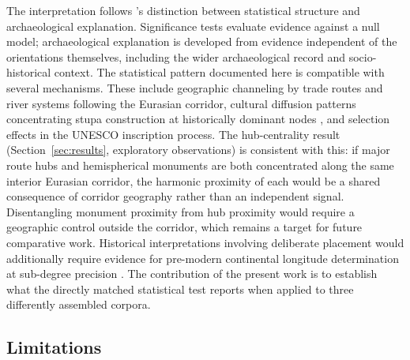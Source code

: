 \documentclass[12pt,a4paper]{article}
\begin{document}
The interpretation follows \citet{silva2020statistical}'s distinction
between statistical structure and archaeological explanation.
Significance tests evaluate evidence against a null model;
archaeological explanation is developed from evidence independent of
the orientations themselves, including the wider archaeological record
and socio-historical context. The statistical pattern documented here
is compatible with several mechanisms. These include geographic
channeling by trade routes and river systems following the Eurasian
corridor, cultural diffusion patterns concentrating stupa construction
at historically dominant nodes \citep{sen2014silk}, and selection
effects in the UNESCO inscription process.
The hub-centrality result (Section~\ref{sec:results}, exploratory observations) is consistent
with this: if major route hubs and hemispherical monuments are both
concentrated along the same interior Eurasian corridor, the harmonic
proximity of each would be a shared consequence of corridor geography
rather than an independent signal. Disentangling monument proximity
from hub proximity would require a geographic control outside the
corridor, which remains a target for future comparative work.
Historical interpretations involving deliberate placement would
additionally require evidence for pre-modern continental longitude
determination at sub-degree precision
\citep{hunger2019mul, neugebauer1975history}. The contribution of the
present work is to establish what the directly matched statistical
test reports when applied to three differently assembled corpora.

\subsection{Limitations}
\label{sec:limitations}
\end{document}
